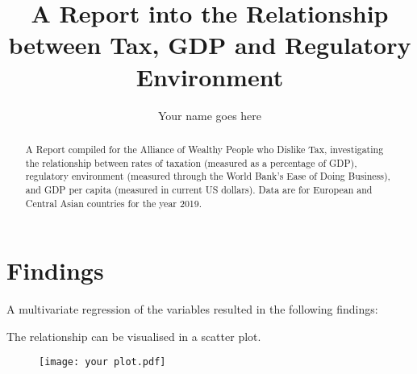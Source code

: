 \documentclass[]{report}
\title{A Report into the Relationship between Tax, GDP and Regulatory Environment}
\author{Your name goes here}
\begin{document}
\maketitle

\begin{abstract}
A Report compiled for the Alliance of Wealthy People who Dislike Tax, investigating the relationship between rates of taxation (measured as a percentage of GDP), regulatory environment (measured through the World Bank's Ease of Doing Business), and GDP per capita (measured in current US dollars). Data are for European and Central Asian countries for the year 2019.
\end{abstract}

\section{Findings}
A multivariate regression of the variables resulted in the following findings:


The relationship can be visualised in a scatter plot.
\begin{figure}[b!]\centering
	\texttt{[image: your plot.pdf]}\\
\end{figure}
\end{document}
